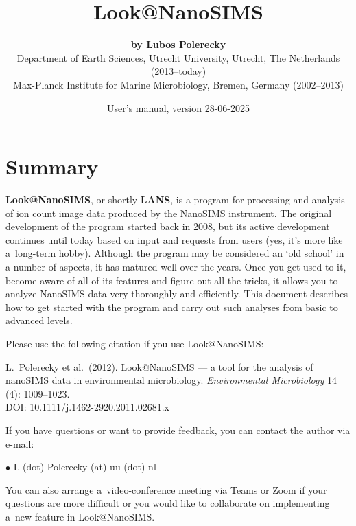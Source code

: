 \documentclass[a4paper, 11pt]{article}
\title{\LARGE \bf Look@NanoSIMS}
\author{{\large\bf by Lubos Polerecky}\\[6mm]
{\small Department of Earth Sciences, Utrecht University, Utrecht, The Netherlands (2013--today)} \\%
{\small Max-Planck Institute for Marine Microbiology, Bremen, Germany (2002--2013)}\\[3mm]}
\date{User's manual, version 28-06-2025}
\newcommand{\ttt}[1]{\textsf{#1}}
\newcommand\bul{\noindent$\bullet${ }}
\newcommand{\skybluebox}[1]{%
\begin{tcolorbox}[
	colback=skyblue!10, 
	coltext=black, coltitle=black,
	colframe=skyblue!70,
	grow to right by=0.5\baselineskip,
	grow to left by=0.5\baselineskip,
    	rounded corners,%
   	left*=0pt,%
    	right*=0pt,%
	fonttitle=\bfseries,
	boxsep=0mm,
	title=#1]}
\newcommand{\goldbox}[1]{%
\begin{tcolorbox}[
	colback=gold!10, 
	coltext=black, coltitle=black,
	colframe=gold!70,
    	rounded corners,%
   	left*=0pt,%
    	right*=0pt,%
	grow to right by=0.5\baselineskip,
	grow to left by=0.5\baselineskip,
	fonttitle=\bfseries,
	boxsep=0mm,
	title=#1]}
\newcommand{\tcbe}{\end{tcolorbox}}
\begin{document}
\iftrue

\maketitle
\reversemarginpar 


\section*{Summary}
\textbf{Look@NanoSIMS}, or shortly \textbf{LANS}, is a program for processing and analysis of ion count image data produced by the NanoSIMS instrument. The original development of the program started back in 2008, but its active development continues until today based on input and requests from users (yes, it's more like a~long-term hobby). Although the program may be considered an `old school' in a number of aspects, it has matured well over the years. Once you get used to it, become aware of all of its features and figure out all the tricks, it allows you to analyze NanoSIMS data very thoroughly and efficiently. This document describes how to get started with the program and carry out such analyses from basic to advanced levels. 

\vskip6mm

\goldbox{Citation:}
Please use the following citation if you use Look@NanoSIMS:

L.~Polerecky et al.~(2012). Look@NanoSIMS --- a tool for the analysis of nanoSIMS data in environmental microbiology. \textit{Environmental Microbiology} 14 (4): 1009--1023.\\
DOI: 10.1111/j.1462-2920.2011.02681.x
\tcbe

\vskip4mm

\skybluebox{Contact:}
If you have questions or want to provide feedback, you can contact the author via e-mail: 

\bul \ttt{L (dot) Polerecky (at) uu (dot) nl}

\vskip1mm\noindent You can also arrange a~video-conference meeting via Teams or Zoom if your questions are more difficult or you would like to collaborate on implementing a~new feature in Look@NanoSIMS.
\tcbe

\newpage

\tableofcontents

\newpage

%
%
%
%
%
%
%

\end{document}

